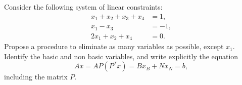 
 Consider the following system of linear constraints:
\begin{align*}
  x_1 + x_2 + x_3 + x_4 &=1, \\
  x_1 - x_3 &= -1, \\
  2 x_1 + x_2 + x_4 &= 0.
\end{align*}
Propose a procedure to eliminate as many variables as possible, except $x_1$. 
Identify the basic and non basic variables, and write explicitly the equation
\[
Ax = AP(P^Tx) = Bx_B + Nx_N = b,
\]
including the matrix $P$.




